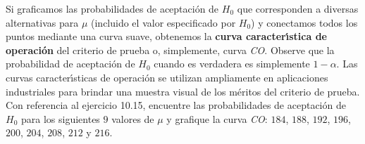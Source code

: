 \begin{enunciado}
 Si graficamos las probabilidades de aceptaci\'on de $H_0$ que corresponden a diversas alternativas para $\mu$ (incluido el valor especificado por $H_0$) y conectamos todos los puntos mediante una curva suave, obtenemos la \textbf{curva caracter\'{\i}stica de operaci\'on} del criterio de prueba o, simplemente, curva \textit{CO}. Observe que la probabilidad de aceptaci\'on de $H_0$ cuando es verdadera es simplemente $1 - \alpha$. Las curvas caracter\'{\i}sticas de operaci\'on se utilizan ampliamente en aplicaciones industriales para brindar una muestra visual de los m\'eritos del criterio de prueba. Con referencia al ejercicio 10.15, encuentre las probabilidades de aceptaci\'on de $H_0$ para los siguientes $9$ valores de $\mu$ y grafique la curva \textit{CO}: $184$, $188$, $192$, $196$, $200$, $204$, $208$, $212$ y $216$.
\end{enunciado}

